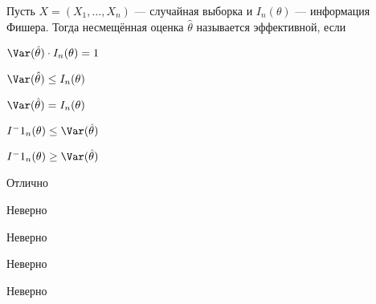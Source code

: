 
\begin{question}
Пусть \(X = (X_1, \ldots , X_n)\) --- случайная выборка и
\(I_n(\theta)\) --- информация Фишера. Тогда несмещённая оценка
\(\hat{\theta}\) называется эффективной, если
\begin{answerlist}
  \item \(\Var(\hat\theta) \cdot I_n (\theta) = 1\)
  \item \(\Var(\hat\theta) \leq I_n (\theta)\)
  \item \(\Var(\hat\theta) = I_n (\theta)\)
  \item \(I^-1_n (\theta) \leq \Var(\hat\theta)\)
  \item \(I^-1_n (\theta) \geq \Var(\hat\theta)\)
\end{answerlist}
\end{question}

\begin{solution}
\begin{answerlist}
  \item Отлично
  \item Неверно
  \item Неверно
  \item Неверно
  \item Неверно
\end{answerlist}
\end{solution}

